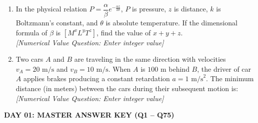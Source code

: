 \documentclass[11pt,a4paper]{article}
\begin{document}
\begin{enumerate}[label=\textbf{\textcolor{l3Crimson}{Q\arabic*.}},leftmargin=24pt,itemsep=10pt,start=51]
  \item In the physical relation $P = \dfrac{\alpha}{\beta} e^{-\frac{\alpha z}{k \theta}}$, $P$ is pressure, $z$ is distance, $k$ is Boltzmann's constant, and $\theta$ is absolute temperature. If the dimensional formula of $\beta$ is $[M^x L^y T^z]$, find the value of $x + y + z$.\\
  \textit{[Numerical Value Question: Enter integer value]}

  \item Two cars $A$ and $B$ are traveling in the same direction with velocities $v_A = 20\text{ m/s}$ and $v_B = 10\text{ m/s}$. When $A$ is $100\text{ m}$ behind $B$, the driver of car $A$ applies brakes producing a constant retardation $a = 1\text{ m/s}^2$. The minimum distance (in meters) between the cars during their subsequent motion is:\\
  \textit{[Numerical Value Question: Enter integer value]}

\end{enumerate}

\newpage

\begin{tcolorbox}[sectionbanner]
  {\Large \textbf{\textsf{DAY 01: MASTER ANSWER KEY (Q1 -- Q75)}}}
\end{tcolorbox}
\vspace{6pt}
\end{document}

